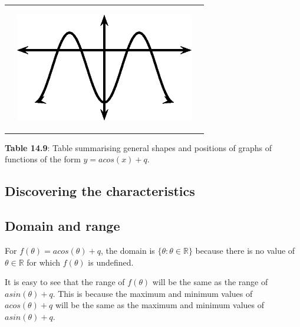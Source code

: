 \begin{center}
\begin{xtabular*}{\mytablewidth}[t]{|p{10\mystarwidth}|p{10\mystarwidth}|p{10\mystarwidth}|}
\begin{center}
\end{center}    
    &
\setcounter{subfigure}{0}
\label{m39414*id88246}
\begin{center}
\label{m39414*id88246!!!underscore!!!media}\label{m39414*id88246!!!underscore!!!printimage}\includegraphics{col11306.imgs/m39414_MG10C15_029.png} %
\vspace{2pt}
\vspace{.1in}
\end{center}    
\tabularnewline{}
\end{xtabular*}
\end{center}
\begin{center}{\small\bfseries Table 14.9}: Table summarising general shapes and positions of graphs of functions of the form $y=acos(x)+q$.\end{center}
\par

\subsection*{Discovering the characteristics}
\subsection*{Domain and range}
\nopagebreak
For $f(\theta )=acos(\theta )+q$, the domain is $\{\theta :\theta \in \mathbb{R}\}$ because there is no value of $\theta \in \mathbb{R}$ for which $f(\theta )$ is undefined.\par 
It is easy to see that the range of $f(\theta )$ will be the same as the range of $asin(\theta )+q$. This is because the maximum and minimum values of $acos(\theta )+q$ will be the same as the maximum and minimum values of $asin(\theta )+q$.\par 

